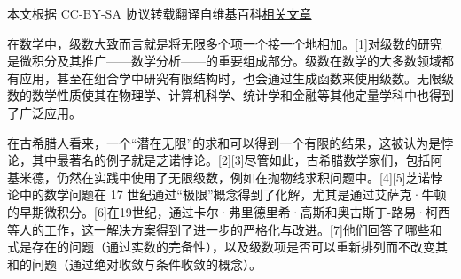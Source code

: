 
本文根据 CC-BY-SA 协议转载翻译自维基百科\href{https://en.wikipedia.org/wiki/Series_(mathematics)}{相关文章}

在数学中，级数大致而言就是将无限多个项一个接一个地相加。[1]对级数的研究是微积分及其推广——数学分析——的重要组成部分。级数在数学的大多数领域都有应用，甚至在组合学中研究有限结构时，也会通过生成函数来使用级数。无限级数的数学性质使其在物理学、计算机科学、统计学和金融等其他定量学科中也得到了广泛应用。

在古希腊人看来，一个“潜在无限”的求和可以得到一个有限的结果，这被认为是悖论，其中最著名的例子就是芝诺悖论。[2][3]尽管如此，古希腊数学家们，包括阿基米德，仍然在实践中使用了无限级数，例如在抛物线求积问题中。[4][5]芝诺悖论中的数学问题在 17 世纪通过“极限”概念得到了化解，尤其是通过艾萨克·牛顿的早期微积分。[6]在19世纪，通过卡尔·弗里德里希·高斯和奥古斯丁-路易·柯西等人的工作，这一解决方案得到了进一步的严格化与改进。[7]他们回答了哪些和式是存在的问题（通过实数的完备性），以及级数项是否可以重新排列而不改变其和的问题（通过绝对收敛与条件收敛的概念）。

